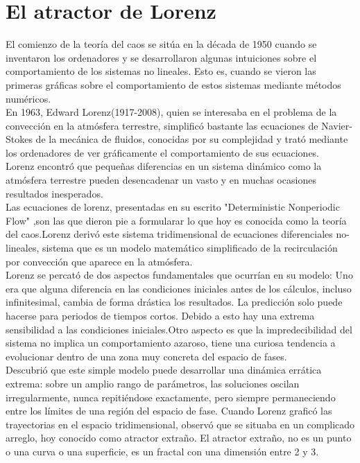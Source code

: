 \documentclass[12pt]{article}
\begin{document}
\section*{El atractor de Lorenz}
El comienzo de la teoría del caos se sitúa en la década de 1950 
cuando se inventaron los ordenadores y se desarrollaron algunas 
intuiciones sobre el comportamiento de los sistemas no lineales. Esto es, 
cuando se vieron las primeras gráficas sobre el comportamiento de estos 
sistemas mediante métodos numéricos.\\
En 1963, Edward Lorenz(1917-2008), quien se interesaba en el problema de 
la convección en la atmósfera terrestre, simplificó bastante las 
ecuaciones de Navier-Stokes de la mecánica de fluidos, conocidas por su 
complejidad y trató mediante los ordenadores de ver gráficamente el 
comportamiento de sus ecuaciones.\\
Lorenz encontró que pequeñas diferencias en un sistema dinámico como la
atmósfera terrestre pueden desencadenar un vasto y en muchas ocasiones
resultados inesperados.%
\\
Las ecuaciones de lorenz, presentadas en su escrito "Deterministic 
Nonperiodic Flow" ,son las que dieron pie a formularar lo que hoy es 
conocida como la teoría del caos.Lorenz derivó este sistema tridimensional de ecuaciones diferenciales no-lineales, sistema que es un modelo matemático simplificado de la recirculación por convección que aparece en la atmósfera. \\
Lorenz se percató de dos aspectos fundamentales que ocurrían en su modelo: Uno era que alguna diferencia en las condiciones iniciales antes de los cálculos, incluso infinitesimal, cambia de forma drástica los resultados. La predicción solo puede hacerse para periodos de tiempos cortos. Debido a esto hay una extrema sensibilidad a las condiciones iniciales.Otro aspecto es que la impredecibilidad del sistema no implica un comportamiento azaroso, tiene una curiosa tendencia a evolucionar dentro de una zona muy concreta del espacio de fases.\\
Descubrió que este simple modelo puede desarrollar una dinámica 
errática extrema: sobre un amplio rango de parámetros, las soluciones 
oscilan irregularmente, nunca repitiéndose exactamente, pero siempre 
permaneciendo entre los límites de una región del espacio de fase. Cuando 
Lorenz graficó las trayectorias en el espacio tridimensional, observó 
que se situaba en un complicado arreglo, hoy conocido como atractor 
extraño. El atractor extraño, no es un punto o una curva o una superficie, 
es un fractal con una dimensión entre 2 y 3.
\end{document}

